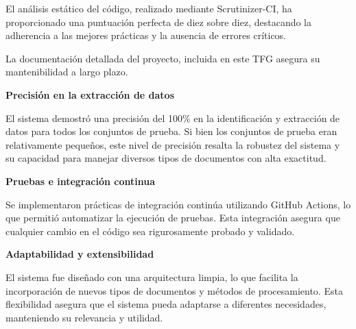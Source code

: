 El análisis estático del código, realizado mediante Scrutinizer-CI, ha proporcionado una puntuación perfecta de diez
sobre diez, destacando la adherencia a las mejores prácticas y la ausencia de errores críticos.

La documentación detallada del proyecto, incluida en este TFG asegura su mantenibilidad a largo plazo.

\textbf {Precisión en la extracción de datos}

El sistema demostró una precisión del 100\% en la identificación y extracción de datos para todos los conjuntos de
prueba.
Si bien los conjuntos de prueba eran relativamente pequeños, este nivel de precisión resalta la robustez del sistema y
su capacidad para manejar diversos tipos de documentos con alta exactitud.

\textbf {Pruebas e integración continua}

Se implementaron prácticas de integración continúa utilizando GitHub Actions, lo que permitió automatizar la ejecución
de pruebas.
Esta integración asegura que cualquier cambio en el código sea rigurosamente probado y validado.

\textbf {Adaptabilidad y extensibilidad}

El sistema fue diseñado con una arquitectura limpia, lo que facilita la incorporación de nuevos tipos de documentos y
métodos de procesamiento.
Esta flexibilidad asegura que el sistema pueda adaptarse a diferentes necesidades, manteniendo su relevancia y utilidad.